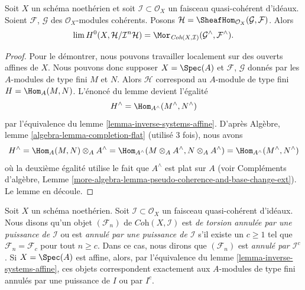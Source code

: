 \begin{lemma}
\label{lemma-completion-internal-hom}
Soit $X$ un schéma noethérien et soit $\mathcal{I} \subset \mathcal{O}_X$
un faisceau quasi-cohérent d'idéaux. Soient $\mathcal{F}$, $\mathcal{G}$
des $\mathcal{O}_X$-modules cohérents. Posons
$\mathcal{H} = \SheafHom_{\mathcal{O}_X}(\mathcal{G}, \mathcal{F})$.
Alors
$$
\lim H^0(X, \mathcal{H}/\mathcal{I}^n\mathcal{H}) =
\Mor_{\textit{Coh}(X, \mathcal{I})}
(\mathcal{G}^\wedge, \mathcal{F}^\wedge).
$$
\end{lemma}

\begin{proof}
Pour le démontrer, nous pouvons travailler localement sur des ouverts affines de $X$.
Nous pouvons donc supposer $X = \Spec(A)$ et $\mathcal{F}$, $\mathcal{G}$
donnés par les $A$-modules de type fini $M$ et $N$. Alors $\mathcal{H}$
correspond au $A$-module de type fini $H = \Hom_A(M, N)$.
L'énoncé du lemme devient l'égalité
$$
H^\wedge = \Hom_{A^\wedge}(M^\wedge, N^\wedge)
$$
par l'équivalence du lemme \ref{lemma-inverse-systems-affine}.
D'après Algèbre, lemme \ref{algebra-lemma-completion-flat}
(utilisé 3 fois), nous avons
$$
H^\wedge = \Hom_A(M, N) \otimes_A A^\wedge =
\Hom_{A^\wedge}(M \otimes_A A^\wedge, N \otimes_A A^\wedge) =
\Hom_{A^\wedge}(M^\wedge, N^\wedge)
$$
où la deuxième égalité utilise le fait que $A^\wedge$ est plat sur $A$
(voir Compléments d'algèbre, Lemme
\ref{more-algebra-lemma-pseudo-coherence-and-base-change-ext}).
Le lemme en découle.
\end{proof}

\noindent
Soit $X$ un schéma noethérien. Soit $\mathcal{I} \subset \mathcal{O}_X$
un faisceau quasi-cohérent d'idéaux. Nous disons qu'un objet $(\mathcal{F}_n)$ de
$\textit{Coh}(X, \mathcal{I})$ est {\it de torsion annulée par une puissance de $\mathcal{I}$}
ou est {\it annulé par une puissance de $\mathcal{I}$} s'il existe
un $c \geq 1$ tel que $\mathcal{F}_n = \mathcal{F}_c$ pour tout $n \geq c$.
Dans ce cas, nous dirons que $(\mathcal{F}_n)$ est {\it annulé par
$\mathcal{I}^c$}. Si $X = \Spec(A)$ est affine, alors, par l'équivalence du
lemme \ref{lemma-inverse-systems-affine},
ces objets correspondent exactement aux $A$-modules de
type fini annulés par une puissance de $I$ ou par $I^c$.

